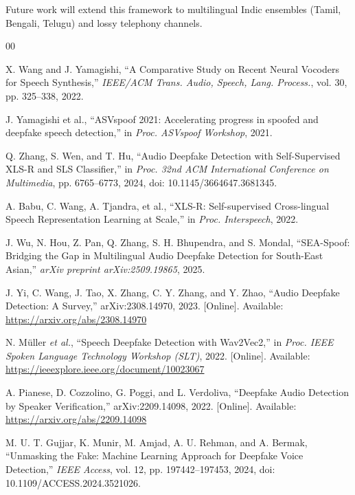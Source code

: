 \documentclass[conference]{IEEEtran}
\begin{document}
Future work will extend this framework to multilingual Indic ensembles (Tamil, Bengali, Telugu) and lossy telephony channels.

\balance


\begin{thebibliography}{00}

X. Wang and J. Yamagishi, ``A Comparative Study on Recent Neural Vocoders for Speech Synthesis,'' \textit{IEEE/ACM Trans. Audio, Speech, Lang. Process.}, vol. 30, pp. 325--338, 2022.

J. Yamagishi et al., ``ASVspoof 2021: Accelerating progress in spoofed and deepfake speech detection,'' in \textit{Proc. ASVspoof Workshop}, 2021.

Q. Zhang, S. Wen, and T. Hu, ``Audio Deepfake Detection with Self-Supervised XLS-R and SLS Classifier,'' in \textit{Proc. 32nd ACM International Conference on Multimedia}, pp. 6765--6773, 2024, doi: 10.1145/3664647.3681345.

A. Babu, C. Wang, A. Tjandra, et al., ``XLS-R: Self-supervised Cross-lingual Speech Representation Learning at Scale,'' in \textit{Proc. Interspeech}, 2022.

J. Wu, N. Hou, Z. Pan, Q. Zhang, S. H. Bhupendra, and S. Mondal, ``SEA-Spoof: Bridging the Gap in Multilingual Audio Deepfake Detection for South-East Asian,'' \textit{arXiv preprint arXiv:2509.19865}, 2025.

J. Yi, C. Wang, J. Tao, X. Zhang, C. Y. Zhang, and Y. Zhao, ``Audio Deepfake Detection: A Survey,'' arXiv:2308.14970, 2023. [Online]. Available: \url{https://arxiv.org/abs/2308.14970}

N. Müller \textit{et al.}, ``Speech Deepfake Detection with Wav2Vec2,'' in \textit{Proc. IEEE Spoken Language Technology Workshop (SLT)}, 2022. [Online]. Available: \url{https://ieeexplore.ieee.org/document/10023067}

A. Pianese, D. Cozzolino, G. Poggi, and L. Verdoliva, ``Deepfake Audio Detection by Speaker Verification,'' arXiv:2209.14098, 2022. [Online]. Available: \url{https://arxiv.org/abs/2209.14098}

M. U. T. Gujjar, K. Munir, M. Amjad, A. U. Rehman, and A. Bermak, ``Unmasking the Fake: Machine Learning Approach for Deepfake Voice Detection,'' \textit{IEEE Access}, vol. 12, pp. 197442--197453, 2024, doi: 10.1109/ACCESS.2024.3521026.


\end{thebibliography}
\end{document}

